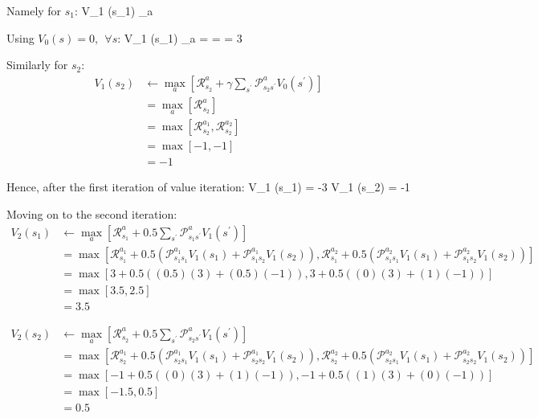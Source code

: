 Namely for $s_1$:
\bse
V_1 (s_1) \gets \max_{a} 
\ese

Using $V_0 (s) = 0, \:\: \forall s$:
\bse
V_1 (s_1) \gets \max_{a}  = \max {} = \max \left[ 3, 3 \right] = 3
\ese

Similarly for $s_2$:
\vspace{-10pt}
{\setlength{\jot}{5pt}
\begin{align*}
V_1 (s_2) &\gets \max_{a} \left[ \mathcal{R}_{s_2}^{a} +
\gamma \sum_{s^{\prime}} \mathcal{P}_{s_2 s^\prime}^{a} V_0 (s^\prime) \right] \\
& = \max_{a} \left[ \mathcal{R}_{s_2}^{a} \right] \\
& = \max \left[ \mathcal{R}_{s_2}^{a_1}, \mathcal{R}_{s_2}^{a_2} \right] \\
& = \max \left[ -1, -1 \right] \\
& = -1
\end{align*}}

\vspace{-10pt}

Hence, after the first iteration of value iteration:
\bse
V_1 (s_1) = -3 \qquad V_1 (s_2) = -1
\ese

Moving on to the second iteration:
{\setlength{\jot}{10pt}
\begin{align*}
V_2 (s_1) & \gets \max_{a} \left[ \mathcal{R}_{s_1}^{a} +
0.5 \sum_{s^{\prime}} \mathcal{P}_{s_1 s^\prime}^{a} V_1 (s^\prime) \right] \\
& = \max \left[ \mathcal{R}_{s_1}^{a_1} + 0.5 \left( \mathcal{P}_{s_1 s_1}^{a_1} V_1 (s_1) +
\mathcal{P}_{s_1 s_2}^{a_1} V_1 (s_2) \right), \mathcal{R}_{s_1}^{a_2} +
0.5 \left( \mathcal{P}_{s_1 s_1}^{a_2} V_1 (s_1) + \mathcal{P}_{s_1 s_2}^{a_2} V_1 (s_2) \right) \right] \\
& = \max \left[ 3 + 0.5 \left( (0.5) (3) + (0.5) (-1) \right), 3 + 0.5 \left( (0) (3) + (1) (-1) \right) \right] \\
& = \max \left[ 3.5, 2.5 \right] \\
& = 3.5
\end{align*}}

\vspace{-30pt}

{\setlength{\jot}{10pt}
\begin{align*}
V_2 (s_2) & \gets \max_{a} \left[ \mathcal{R}_{s_2}^{a} + 0.5 \sum_{s^{\prime}}
\mathcal{P}_{s_2 s^\prime}^{a} V_1 (s^\prime) \right] \\
& = \max \left[ \mathcal{R}_{s_2}^{a_1} + 0.5 \left(\mathcal{P}_{s_2 s_1}^{a_1} V_1 (s_1) +
\mathcal{P}_{s_2 s_2}^{a_1} V_1 (s_2) \right), \mathcal{R}_{s_2}^{a_2} +
0.5 \left( \mathcal{P}_{s_2 s_1}^{a_2} V_1 (s_1) + \mathcal{P}_{s_2 s_2}^{a_2} V_1 (s_2) \right) \right] \\
& = \max \left[ -1 + 0.5 \left( (0) (3) + (1) (-1) \right), -1 + 0.5 \left( (1) (3) + (0) (-1) \right) \right] \\
& = \max \left[ -1.5, 0.5 \right] \\
& = 0.5
\end{align*}}

